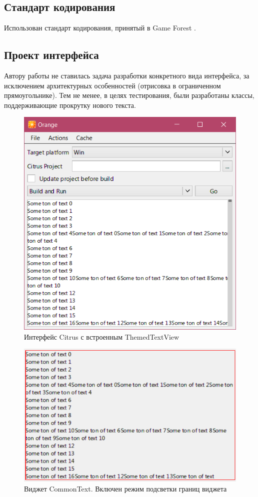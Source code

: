 \documentclass{fefu}
\begin{document}
		\subsection{Стандарт кодирования}
			Использован стандарт кодирования, принятый в Game Forest \cite{CodingConventions}.
		\subsection{Проект интерфейса}
			\par Автору работы не ставилась задача разработки конкретного вида интерфейса, за
			исключением архитектурных особенностей (отрисовка в ограниченном прямоугольнике).
			Тем не менее, в целях тестирования, были разработаны классы, поддерживающие 
			прокрутку нового текста.
			\begin{figure}[H]
				\centering
				\includegraphics[width=1\linewidth]{images/ScrollViewInt.png}
				\caption{Интерфейс Citrus с встроенным ThemedTextView}
			\end{figure}
			\begin{figure}[H]
				\centering
				\includegraphics[width=1\linewidth]{images/CommonTextInt.png}
				\caption{Виджет CommonText. Включен режим подсветки 
				границ виджета}
			\end{figure}
\end{document}
